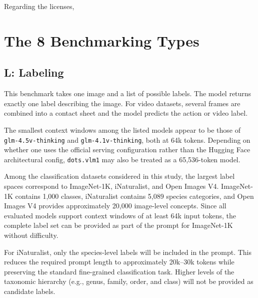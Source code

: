 \documentclass{article}
\begin{document}
Regarding the licenses, 
































\section{The 8 Benchmarking Types}

\subsection{\textbf{L}: Labeling}

This benchmark takes one image and a list of possible labels. The model returns exactly one label describing the image. For video datasets, several frames are combined into a contact sheet and the model predicts the action or video label.

The smallest context windows among the listed models appear to be those of
\texttt{glm-4.5v-thinking} and \texttt{glm-4.1v-thinking}, both at 64k tokens.
Depending on whether one uses the official serving configuration rather than
the Hugging Face architectural config, \texttt{dots.vlm1} may also be treated
as a 65,536-token model.

Among the classification datasets considered in this study, the largest label spaces correspond to ImageNet-1K, iNaturalist, and Open Images V4. ImageNet-1K contains 1,000 classes, iNaturalist contains 5,089 species categories, and Open Images V4 provides approximately 20,000 image-level concepts. Since all evaluated models support context windows of at least 64k input tokens, the complete label set can be provided as part of the prompt for ImageNet-1K without difficulty.

For iNaturalist, only the species-level labels will be included in the prompt. This reduces the required prompt length to approximately 20k--30k tokens while preserving the standard fine-grained classification task. Higher levels of the taxonomic hierarchy (e.g., genus, family, order, and class) will not be provided as candidate labels.
\end{document}

